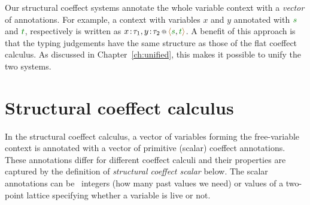 Our structural coeffect systems annotate the whole variable context with a \emph{vector} of annotations.
For example, a context with variables $x$ and $y$ annotated with $\cclrd{s}$ and $\cclrd{t}$,
respectively is written as $\coctx{x\!:\!\tau_1,y\!:\!\tau_2}{\alift{\cclrd{s},\cclrd{t}}}$.
A benefit of this approach is that the typing judgements have the same structure as those of the
flat coeffect calculus. As discussed in Chapter~\ref{ch:unified}, this makes it possible to unify
the two systems.


%
%

\section{Structural coeffect calculus}
\label{sec:struct-calculus}

In the structural coeffect calculus, a vector of variables forming the free-variable context is
annotated with a vector of primitive (scalar) coeffect annotations. These annotations differ
for different coeffect calculi and their properties are captured by the definition of \emph{structural
coeffect scalar} below. The scalar annotations can be \eg~integers (how many past values we
need) or values of a two-point lattice specifying whether a variable is live or not.

